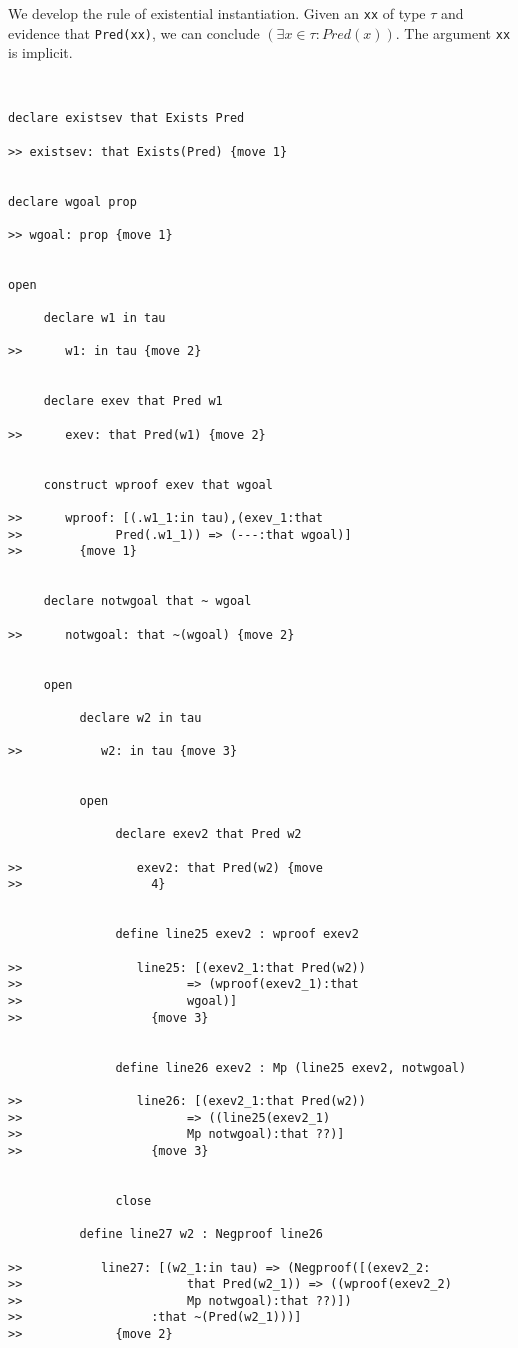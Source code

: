 \documentclass[12pt]{article}
\begin{document}
We develop the rule of existential instantiation.  Given an {\tt xx} of type $\tau$ and evidence that {\tt Pred(xx)}, we can conclude $(\exists x \in \tau:Pred(x))$.  The argument {\tt xx} is implicit.

\begin{verbatim}


declare existsev that Exists Pred

>> existsev: that Exists(Pred) {move 1}


declare wgoal prop

>> wgoal: prop {move 1}


open

     declare w1 in tau

>>      w1: in tau {move 2}


     declare exev that Pred w1

>>      exev: that Pred(w1) {move 2}


     construct wproof exev that wgoal

>>      wproof: [(.w1_1:in tau),(exev_1:that 
>>             Pred(.w1_1)) => (---:that wgoal)]
>>        {move 1}


     declare notwgoal that ~ wgoal

>>      notwgoal: that ~(wgoal) {move 2}


     open

          declare w2 in tau

>>           w2: in tau {move 3}


          open 

               declare exev2 that Pred w2

>>                exev2: that Pred(w2) {move 
>>                  4}


               define line25 exev2 : wproof exev2

>>                line25: [(exev2_1:that Pred(w2)) 
>>                       => (wproof(exev2_1):that 
>>                       wgoal)]
>>                  {move 3}


               define line26 exev2 : Mp (line25 exev2, notwgoal)

>>                line26: [(exev2_1:that Pred(w2)) 
>>                       => ((line25(exev2_1) 
>>                       Mp notwgoal):that ??)]
>>                  {move 3}


               close

          define line27 w2 : Negproof line26

>>           line27: [(w2_1:in tau) => (Negproof([(exev2_2:
>>                       that Pred(w2_1)) => ((wproof(exev2_2) 
>>                       Mp notwgoal):that ??)])
>>                  :that ~(Pred(w2_1)))]
>>             {move 2}



\end{verbatim}
\end{document}
